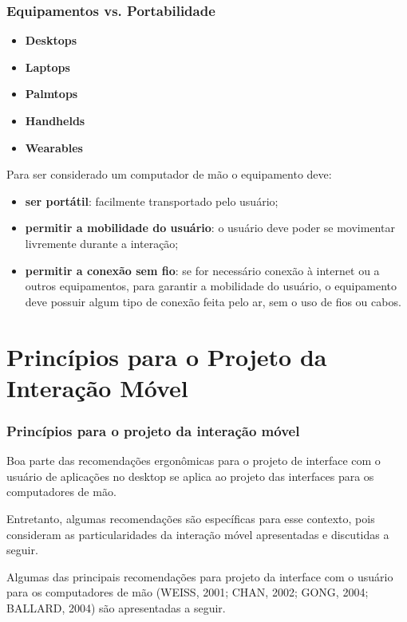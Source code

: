 \documentclass[presentation]{beamer}
\begin{document}
\begin{frame}[c]\frametitle{Equipamentos vs. Portabilidade}
    
    \begin{itemize}
        \item \textbf{Desktops}
        \item \textbf{Laptops}
        \item \textbf{Palmtops}
        \item \textbf{Handhelds}
        \item \textbf{Wearables}
    \end{itemize}

    Para ser considerado um computador de mão o equipamento deve:

    \begin{itemize}
        \item \textbf{ser portátil}: facilmente transportado pelo usuário;
        \item \textbf{permitir a mobilidade do usuário}: o usuário deve poder se movimentar livremente durante a interação; 
        \item \textbf{permitir a conexão sem fio}: se for necessário conexão à internet ou a outros equipamentos, para garantir a mobilidade do usuário, o equipamento deve possuir algum tipo de conexão feita pelo ar, sem o uso de fios ou cabos.
    \end{itemize}

\end{frame}




\section{Princípios para o Projeto da Interação Móvel} %
\label{sec:principios_para_o_projeto_da_interacao_movel}

\begin{frame}[c]\frametitle{Princípios para o projeto da interação móvel}
    
    Boa parte das recomendações ergonômicas para o projeto de interface com o usuário de aplicações no desktop se aplica ao projeto das interfaces para os computadores de mão.

    Entretanto, algumas recomendações são específicas para esse contexto, pois consideram as particularidades da interação móvel apresentadas e discutidas a seguir.

    Algumas das principais recomendações para projeto da interface com o usuário para os computadores de mão (WEISS, 2001; CHAN, 2002; GONG, 2004; BALLARD, 2004) são apresentadas a seguir.

\end{frame}
\end{document}
